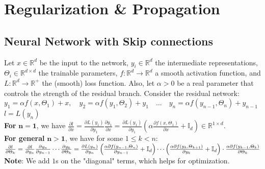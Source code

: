 \section{Regularization \& Propagation}
\subsection{Neural Network with Skip connections}
Let $x \in \mathbb{R}^d$ be the input to the network, $y_i \in \mathbb{R}^d$ the intermediate representations, $\Theta_i \in \mathbb{R}^{d\times d}$ the trainable parameters, $f: \mathbb{R}^d \to \mathbb{R}^d$ a smooth activation function, and $L: \mathbb{R}^d \to \mathbb{R}^+$ the (smooth) loss function. Also, let $\alpha > 0$ be a real parameter that controls the strength of the residual branch. Consider the residual network: \\
$y_1 = \alpha f(x, \Theta_1) + x, \quad y_2 = \alpha f(y_1, \Theta_2) + y_1 \quad \dots \quad y_n = \alpha f(y_{n-1}, \Theta_n) + y_{n-1}$\\
 $ l = L(y_n)$ \\
\textbf{For} $\mathbf{n=1}$, we have $\frac{\partial l}{\partial x} = \frac{\partial L(y_1)}{\partial y_1} \frac{\partial y_1}{\partial x} = \frac{\partial L(y_1)}{\partial y_1} \left(\alpha\frac{\partial f(x, \Theta_1)}{\partial x} +\mathbb{I}_d\right) \in \mathbb{R}^{1\times d}$. \\
\textbf{For general} $\mathbf{n>1}$, we have for some $1 \leq k <n$: 
$\frac{\partial l}{\partial \Theta_k} = \frac{\partial l}{\partial y_n} \frac{\partial y_n}{\partial y_{n-1}} \cdots \frac{\partial y_k}{\partial \Theta_k} = \\
\frac{\partial L(y_n)}{\partial y_n}\left(\frac{\alpha\partial f(y_{n-1}, \Theta_n)}{\partial y_{n-1}} + \mathbb{I}_d \right) \cdots \left(\frac{\alpha\partial f(y_{k}, \Theta_{k+1})}{\partial y_{k}} + \mathbb{I}_d \right) \cdot  \frac{\alpha\partial f(y_{k-1}, \Theta_k)}{\partial \Theta_k}$\\
\textbf{Note}: We add $1$s on the "diagonal" terms, which helps for optimization.

